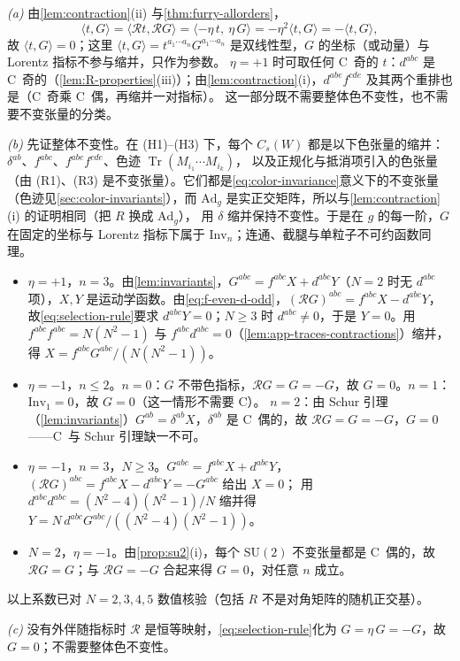 \documentclass[UTF8,a4paper,11pt,fontset=fandol]{ctexart}
\makeatletter
\theoremstyle{cplain}
\theoremstyle{cdefinition}
\theoremstyle{cremark}
\renewcommand{\proofname}{证明}
\renewenvironment{proof}[1][\proofname]{\par\pushQED{\qed}\normalfont\topsep6\p@\@plus6\p@\relax
  \trivlist\item[\hskip\labelsep\itshape #1\hspace{0.5em}]\ignorespaces}{\popQED\endtrivlist\@endpefalse}
\numberwithin{equation}{section}
\DeclareMathOperator{\Tr}{Tr}
\newcommand{\Rop}{\mathcal{R}}                       %
\makeatother
\begin{document}
\begin{proof}
\emph{(a)} 由\cref{lem:contraction}(ii) 与\cref{thm:furry-allorders}，
\[
\langle t,G\rangle=\langle\Rop t,\Rop G\rangle=\langle-\eta\,t,\ \eta\,G\rangle=-\eta^2\langle t,G\rangle=-\langle t,G\rangle ,
\]
故 $\langle t,G\rangle=0$；这里 $\langle t,G\rangle=t^{a_1\cdots a_n}G^{a_1\cdots a_n}$ 是双线性型，$G$ 的坐标（或动量）与 Lorentz 指标不参与缩并，只作为参数。
$\eta=+1$ 时可取任何 C~奇的 $t$：$d^{abc}$ 是 C~奇的（\cref{lem:R-properties}(iii)）；由\cref{lem:contraction}(i)，$d^{abe}f^{cde}$ 及其两个重排也是（C~奇乘 C~偶，再缩并一对指标）。
这一部分既不需要整体色不变性，也不需要不变张量的分类。

\emph{(b)} 先证整体不变性。在 (H1)--(H3) 下，每个 $C_s(W)$ 都是以下色张量的缩并：$\delta^{ab}$、$f^{abc}$、$f^{abe}f^{cde}$、色迹 $\Tr(M_{i_1}\cdots M_{i_k})$，
以及正规化与抵消项引入的色张量（由 (R1)、(R3) 是不变张量）。它们都是\cref{eq:color-invariance}意义下的不变张量（色迹见\cref{sec:color-invariants}），而 $\mathrm{Ad}_g$ 是实正交矩阵，所以与\cref{lem:contraction}(i) 的证明相同（把 $R$ 换成 $\mathrm{Ad}_g$），
用 $\delta$ 缩并保持不变性。于是在 $g$ 的每一阶，$G$ 在固定的坐标与 Lorentz 指标下属于 $\mathrm{Inv}_n$；连通、截腿与单粒子不可约函数同理。
\begin{itemize}[leftmargin=1.6em,itemsep=2pt,topsep=2pt]
\item $\eta=+1$，$n=3$。由\cref{lem:invariants}，$G^{abc}=f^{abc}X+d^{abc}Y$（$N=2$ 时无 $d^{abc}$ 项），$X,Y$ 是运动学函数。由\cref{eq:f-even-d-odd}，$(\Rop G)^{abc}=f^{abc}X-d^{abc}Y$，
故\cref{eq:selection-rule}要求 $d^{abc}Y=0$；$N\ge3$ 时 $d^{abc}\neq0$，于是 $Y=0$。用 $f^{abc}f^{abc}=N(N^2-1)$ 与 $f^{abc}d^{abc}=0$（\cref{lem:app-traces-contractions}）缩并，得 $X=f^{abc}G^{abc}/(N(N^2-1))$。
\item $\eta=-1$，$n\le2$。$n=0$：$G$ 不带色指标，$\Rop G=G=-G$，故 $G=0$。$n=1$：$\mathrm{Inv}_1=0$，故 $G=0$（这一情形不需要 C）。
$n=2$：由 Schur 引理（\cref{lem:invariants}）$G^{ab}=\delta^{ab}X$，$\delta^{ab}$ 是 C~偶的，故 $\Rop G=G=-G$，$G=0$——C~与 Schur 引理缺一不可。
\item $\eta=-1$，$n=3$，$N\ge3$。$G^{abc}=f^{abc}X+d^{abc}Y$，$(\Rop G)^{abc}=f^{abc}X-d^{abc}Y=-G^{abc}$ 给出 $X=0$；
用 $d^{abc}d^{abc}=(N^2-4)(N^2-1)/N$ 缩并得 $Y=N\,d^{abc}G^{abc}/((N^2-4)(N^2-1))$。
\item $N=2$，$\eta=-1$。由\cref{prop:su2}(i)，每个 $\mathrm{SU}(2)$ 不变张量都是 C~偶的，故 $\Rop G=G$；与 $\Rop G=-G$ 合起来得 $G=0$，对任意 $n$ 成立。
\end{itemize}
以上系数已对 $N=2,3,4,5$ 数值核验（包括 $R$ 不是对角矩阵的随机正交基）。

\emph{(c)} 没有外伴随指标时 $\Rop$ 是恒等映射，\cref{eq:selection-rule}化为 $G=\eta\,G=-G$，故 $G=0$；不需要整体色不变性。
\end{proof}
\end{document}
